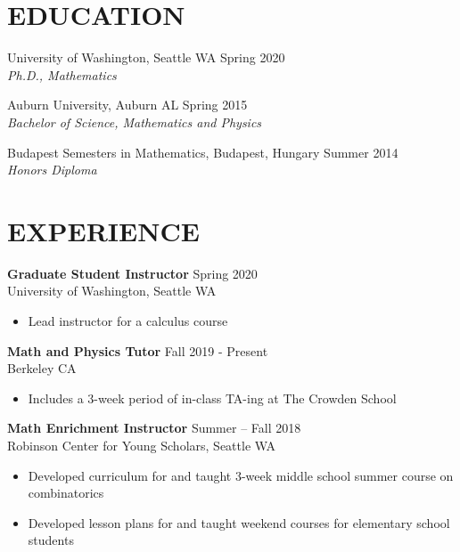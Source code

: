 \documentclass{res}
\begin{document}



\address{\bf
CONTACT \\
grahamwalkergordon@gmail.com \(\mid\)
\url{https://grahamwgordon.github.io/}
}
\begin{resume}


\section{EDUCATION}
  \vspace{2mm}
  University of Washington, Seattle WA \hfill Spring 2020\\
  \textit{Ph.D., Mathematics}

  Auburn University, Auburn AL \hfill Spring 2015 \\
  \textit{Bachelor of Science, Mathematics and Physics}

  Budapest Semesters in Mathematics, Budapest, Hungary \hfill Summer 2014 \\
  \textit{Honors Diploma}


\section{EXPERIENCE}
  \vspace{2mm}

{\bf Graduate Student Instructor} \hfill Spring 2020 \\ University of Washington, Seattle WA

\begin{itemize}
\item Lead instructor for a calculus course
\end{itemize}


{\bf Math and Physics Tutor} \hfill Fall 2019 - Present \\ Berkeley CA
\begin{itemize}
\item Includes a 3-week period of in-class TA-ing at The Crowden School
\end{itemize}


{\bf Math Enrichment Instructor} \hfill Summer -- Fall 2018 \\
Robinson Center for Young Scholars, Seattle WA

\begin{itemize}
\item Developed curriculum for and taught 3-week middle school summer course on combinatorics
\item Developed lesson plans for and taught weekend courses for elementary school students
\end{itemize}



\end{resume}
\end{document}
